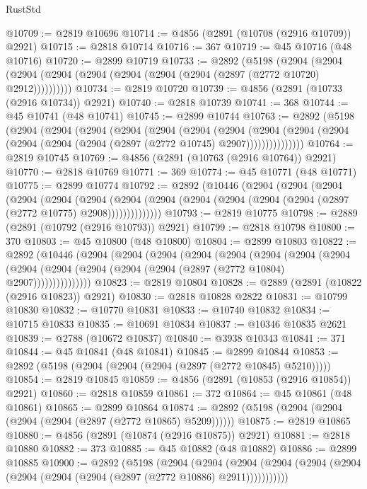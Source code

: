 \begin{lexlean}{RustStd}
\begin{coremodule}
@10709 := @2819 @10696
@10714 := @4856 (@2891 (@10708 (@2916 @10709)) @2921)
@10715 := @2818 @10714
@10716 := 367
@10719 := @45 @10716 (@48 @10716)
@10720 := @2899 @10719
@10733 := @2892
    (@5198
      (@2904 (@2904 (@2904 (@2904 (@2904 (@2904 (@2904 (@2904 (@2897 (@2772 @10720) @2912))))))))))
@10734 := @2819 @10720
@10739 := @4856 (@2891 (@10733 (@2916 @10734)) @2921)
@10740 := @2818 @10739
@10741 := 368
@10744 := @45 @10741 (@48 @10741)
@10745 := @2899 @10744
@10763 := @2892
    (@5198
      (@2904
        (@2904
          (@2904
            (@2904
              (@2904
                (@2904
                  (@2904
                    (@2904
                      (@2904 (@2904 (@2904 (@2904 (@2904 (@2897 (@2772 @10745) @2907)))))))))))))))
@10764 := @2819 @10745
@10769 := @4856 (@2891 (@10763 (@2916 @10764)) @2921)
@10770 := @2818 @10769
@10771 := 369
@10774 := @45 @10771 (@48 @10771)
@10775 := @2899 @10774
@10792 := @2892
    (@10446
      (@2904
        (@2904
          (@2904
            (@2904
              (@2904
                (@2904
                  (@2904
                    (@2904 (@2904 (@2904 (@2904 (@2904 (@2897 (@2772 @10775) @2908))))))))))))))
@10793 := @2819 @10775
@10798 := @2889 (@2891 (@10792 (@2916 @10793)) @2921)
@10799 := @2818 @10798
@10800 := 370
@10803 := @45 @10800 (@48 @10800)
@10804 := @2899 @10803
@10822 := @2892
    (@10446
      (@2904
        (@2904
          (@2904
            (@2904
              (@2904
                (@2904
                  (@2904
                    (@2904
                      (@2904 (@2904 (@2904 (@2904 (@2904 (@2897 (@2772 @10804) @2907)))))))))))))))
@10823 := @2819 @10804
@10828 := @2889 (@2891 (@10822 (@2916 @10823)) @2921)
@10830 := @2818 @10828 @2822
@10831 := @10799 @10830
@10832 := @10770 @10831
@10833 := @10740 @10832
@10834 := @10715 @10833
@10835 := @10691 @10834
@10837 := @10346 @10835 @2621
@10839 := @2788 (@10672 @10837)
@10840 := @3938 @10343
@10841 := 371
@10844 := @45 @10841 (@48 @10841)
@10845 := @2899 @10844
@10853 := @2892 (@5198 (@2904 (@2904 (@2904 (@2897 (@2772 @10845) @5210)))))
@10854 := @2819 @10845
@10859 := @4856 (@2891 (@10853 (@2916 @10854)) @2921)
@10860 := @2818 @10859
@10861 := 372
@10864 := @45 @10861 (@48 @10861)
@10865 := @2899 @10864
@10874 := @2892 (@5198 (@2904 (@2904 (@2904 (@2904 (@2897 (@2772 @10865) @5209))))))
@10875 := @2819 @10865
@10880 := @4856 (@2891 (@10874 (@2916 @10875)) @2921)
@10881 := @2818 @10880
@10882 := 373
@10885 := @45 @10882 (@48 @10882)
@10886 := @2899 @10885
@10900 := @2892
    (@5198
      (@2904
        (@2904
          (@2904 (@2904 (@2904 (@2904 (@2904 (@2904 (@2904 (@2897 (@2772 @10886) @2911)))))))))))

\end{coremodule}
\end{lexlean}
